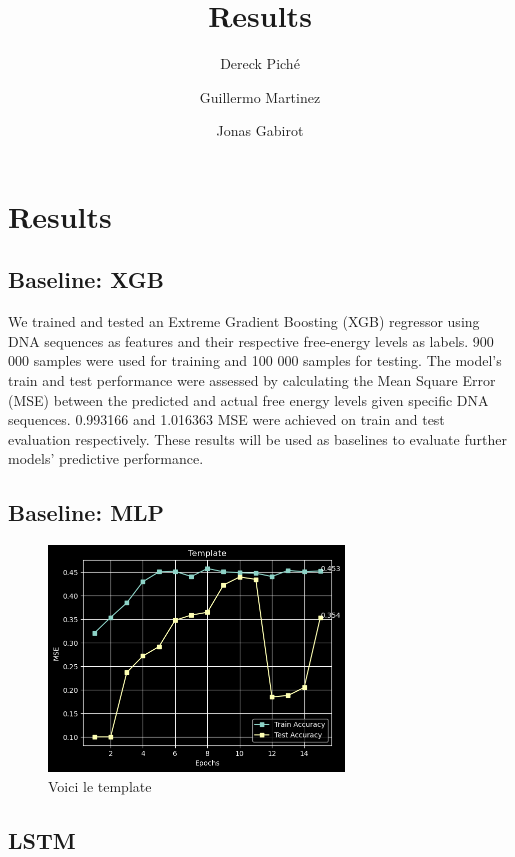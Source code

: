 \documentclass{article}
\title{Results}
\author
{
    Dereck Piché \and
    Guillermo Martinez \and
    Jonas Gabirot \and
}
\begin{document}
\maketitle

\section{Results}

\subsection{Baseline: XGB}
We trained and tested an Extreme Gradient Boosting (XGB) regressor using DNA sequences as features and their respective free-energy levels as labels. 900 000 samples were used for training and 100 000 samples for testing. The model's train and test performance were assessed by calculating the Mean Square Error (MSE) between the predicted and actual free energy levels given specific DNA sequences. 0.993166 and 1.016363 MSE were achieved on train and test evaluation respectively. These results will be used as baselines to evaluate further models' predictive performance.


\subsection{Baseline: MLP}

\begin{figure} \label{fig:template}
    \caption{Voici le template} \center
    \includegraphics[width=0.7\textwidth]{images/2023-03-28-10-29-38.png}
\end{figure}

\subsection{LSTM}
\end{document}
